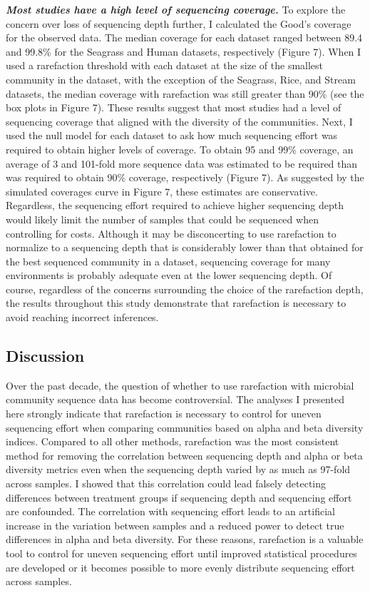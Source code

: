 \documentclass[
]{article}
\begin{document}
\textbf{\emph{Most studies have a high level of sequencing coverage.}}
To explore the concern over loss of sequencing depth further, I
calculated the Good's coverage for the observed data. The median
coverage for each dataset ranged between 89.4 and 99.8\% for the
Seagrass and Human datasets, respectively (Figure 7). When I used a
rarefaction threshold with each dataset at the size of the smallest
community in the dataset, with the exception of the Seagrass, Rice, and
Stream datasets, the median coverage with rarefaction was still greater
than 90\% (see the box plots in Figure 7). These results suggest that
most studies had a level of sequencing coverage that aligned with the
diversity of the communities. Next, I used the null model for each
dataset to ask how much sequencing effort was required to obtain higher
levels of coverage. To obtain 95 and 99\% coverage, an average of 3 and
101-fold more sequence data was estimated to be required than was
required to obtain 90\% coverage, respectively (Figure 7). As suggested
by the simulated coverages curve in Figure 7, these estimates are
conservative. Regardless, the sequencing effort required to achieve
higher sequencing depth would likely limit the number of samples that
could be sequenced when controlling for costs. Although it may be
disconcerting to use rarefaction to normalize to a sequencing depth that
is considerably lower than that obtained for the best sequenced
community in a dataset, sequencing coverage for many environments is
probably adequate even at the lower sequencing depth. Of course,
regardless of the concerns surrounding the choice of the rarefaction
depth, the results throughout this study demonstrate that rarefaction is
necessary to avoid reaching incorrect inferences.

\hypertarget{discussion}{%
\subsection{Discussion}\label{discussion}}

Over the past decade, the question of whether to use rarefaction with
microbial community sequence data has become controversial. The analyses
I presented here strongly indicate that rarefaction is necessary to
control for uneven sequencing effort when comparing communities based on
alpha and beta diversity indices. Compared to all other methods,
rarefaction was the most consistent method for removing the correlation
between sequencing depth and alpha or beta diversity metrics even when
the sequencing depth varied by as much as 97-fold across samples. I
showed that this correlation could lead falsely detecting differences
between treatment groups if sequencing depth and sequencing effort are
confounded. The correlation with sequencing effort leads to an
artificial increase in the variation between samples and a reduced power
to detect true differences in alpha and beta diversity. For these
reasons, rarefaction is a valuable tool to control for uneven sequencing
effort until improved statistical procedures are developed or it becomes
possible to more evenly distribute sequencing effort across samples.
\end{document}
